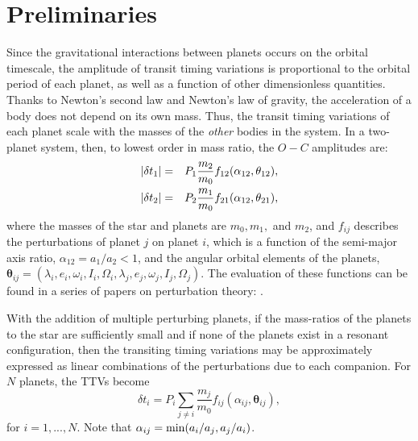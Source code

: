 \documentclass[graybox,natbib,nosecnum]{svmult}
\begin{document}

\section{Preliminaries}

Since the gravitational interactions between planets occurs on the orbital timescale, the
amplitude of transit timing variations is proportional to the orbital period of each planet,
as well as a function of other dimensionless quantities.  Thanks to Newton's second law
and Newton's law of gravity, the acceleration of a body does not depend on its own mass.
Thus, the transit timing variations of each planet scale with the masses of the {\it other} bodies
in the system.
In a two-planet system, then, to lowest order in mass ratio, the $O-C$ amplitudes are: 
\begin{eqnarray}
\vert \delta t_1\vert &=& P_1 \frac{m_2}{m_0} f_{12}(\alpha_{12},\mathbf{\theta}_{12}),\cr
\vert \delta t_2\vert &=& P_2 \frac{m_1}{m_0} f_{21}(\alpha_{12},\mathbf{\theta}_{21}),
\end{eqnarray}
where the masses of the star and planets are $m_0, m_1,$ and $m_2$, and $f_{ij}$ describes the perturbations of planet $j$ on planet $i$,
which is a function of the semi-major axis ratio, $\alpha_{12}= a_1/a_2 < 1$, and the angular orbital 
elements of the planets, $\mathbf{\theta}_{ij} = (\lambda_i,e_i,\omega_i,I_i,\Omega_i,\lambda_j,e_j,\omega_j,I_j,\Omega_j)$.  The evaluation of these functions can be found in a series of papers on perturbation theory: \cite{2008ApJ...688..636N, 2009ApJ...701.1116N,2010ApJ...709L..44N,2016ApJ...818..177A,2016ApJ...821...96D}.

With the addition of multiple perturbing planets, if the mass-ratios of the planets to the star are
sufficiently small and if none of the planets exist in a resonant configuration, then the transiting timing 
variations may be approximately expressed as linear combinations of the perturbations due to each companion.
For $N$ planets, the TTVs become
\begin{equation}
\delta t_i = P_i \sum_{j \ne i}  \frac{m_j}{m_0} f_{ij}(\alpha_{ij},\mathbf{\theta}_{ij}),
\end{equation}
for $i=1,...,N$.
Note that $\alpha_{ij} = {\rm min}(a_i/a_j,a_j/a_i)$.
\end{document}
